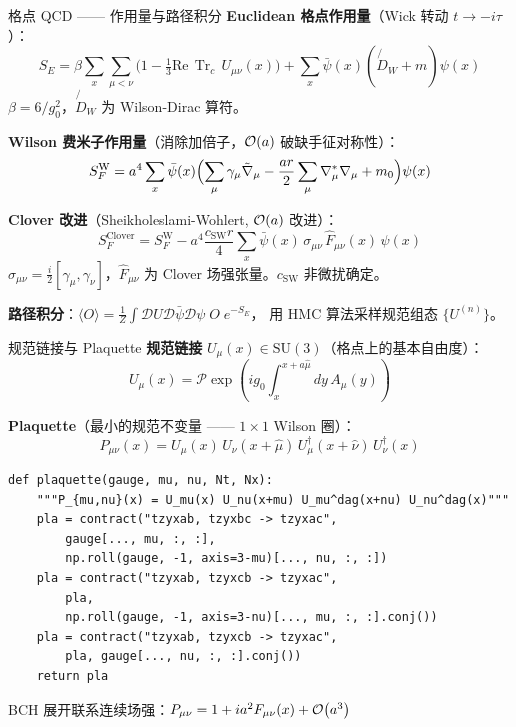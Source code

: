 \documentclass[10pt,aspectratio=169]{beamer}
\newcommand{\trc}{\operatorname{Tr}_c}
\begin{document}
\begin{frame}{格点 QCD —— 作用量与路径积分}
\small
\textbf{Euclidean 格点作用量}（Wick 转动 $t \to -i\tau$）：
\begin{equation}
  S_E = \beta \sum_x \sum_{\mu<\nu} \bigl(1 - \tfrac{1}{3}\mathrm{Re}\,\trc\,U_{\mu\nu}(x)\bigr)
       + \sum_x \bar{\psi}(x)(\not{D}_W + m)\psi(x)
\end{equation}
$\beta = 6/g_0^2$，$\not{D}_W$ 为 Wilson-Dirac 算符。

\textbf{Wilson 费米子作用量}（消除加倍子，$\order{a}$ 破缺手征对称性）：
\begin{equation}
  S_F^{\text{W}} = a^4 \sum_x \bar{\psi}(x)
  \Bigl( \sum_\mu \gamma_\mu \tilde{\nabla}_\mu - \frac{ar}{2}\sum_\mu \nabla_\mu^*\nabla_\mu + m_0 \Bigr) \psi(x)
\end{equation}

\textbf{Clover 改进}（Sheikholeslami-Wohlert, $\order{a}$ 改进）：
\begin{equation}
  S_F^{\text{Clover}} = S_F^{\text{W}}
  - a^4\frac{c_{\text{SW}} r}{4}\sum_x \bar{\psi}(x)\,\sigma_{\mu\nu}\,\hat{F}_{\mu\nu}(x)\,\psi(x)
\end{equation}
$\sigma_{\mu\nu} = \frac{i}{2}[\gamma_\mu,\gamma_\nu]$，$\hat{F}_{\mu\nu}$ 为 Clover 场强张量。$c_{\text{SW}}$ 非微扰确定。

\textbf{路径积分}：$\langle O \rangle = \frac{1}{Z}\int \mathcal{D}U\mathcal{D}\bar{\psi}\mathcal{D}\psi\; O\; e^{-S_E}$，
用 HMC 算法采样规范组态 $\{U^{(n)}\}$。
\end{frame}

\begin{frame}[fragile]{规范链接与 Plaquette}
\small
\textbf{规范链接} $U_\mu(x) \in \mathrm{SU}(3)$（格点上的基本自由度）：
\begin{equation}
  U_\mu(x) = \mathcal{P}\exp\!\left(i g_0 \int_x^{x+a\hat{\mu}} dy\, A_\mu(y)\right)
\end{equation}

\textbf{Plaquette}（最小的规范不变量 —— $1\times 1$ Wilson 圈）：
\begin{equation}
  P_{\mu\nu}(x) = U_\mu(x)\,U_\nu(x+\hat{\mu})\,U_\mu^\dagger(x+\hat{\nu})\,U_\nu^\dagger(x)
\end{equation}

\begin{lstlisting}
def plaquette(gauge, mu, nu, Nt, Nx):
    """P_{mu,nu}(x) = U_mu(x) U_nu(x+mu) U_mu^dag(x+nu) U_nu^dag(x)"""
    pla = contract("tzyxab, tzyxbc -> tzyxac",
        gauge[..., mu, :, :],
        np.roll(gauge, -1, axis=3-mu)[..., nu, :, :])
    pla = contract("tzyxab, tzyxcb -> tzyxac",
        pla,
        np.roll(gauge, -1, axis=3-nu)[..., mu, :, :].conj())
    pla = contract("tzyxab, tzyxcb -> tzyxac",
        pla, gauge[..., nu, :, :].conj())
    return pla
\end{lstlisting}

BCH 展开联系连续场强：$P_{\mu\nu} = 1 + i a^2 F_{\mu\nu}(x) + \order{a^3}$
\end{frame}
\end{document}
